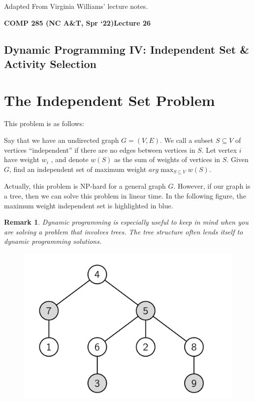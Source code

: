 \documentclass [12pt]{article}
\newtheorem{remark}{Remark}
\theoremstyle{definition}
\begin{document}
 

\vspace {1em} 
\begin {Instruction} 
Adapted From Virginia Williams' lecture notes.
\end {Instruction}  

{\LARGE \textbf {COMP 285 (NC A\&T, Spr `22)}\hfill \textbf {Lecture 26} } 

\begin{centering}
\section*{Dynamic Programming IV: Independent Set \& Activity Selection}
\end{centering}

\section{The Independent Set Problem}

This problem is as follows: 

Say that we have an undirected graph $G = (V, E)$. We call a subset $S \subseteq V$ of vertices ``independent'' if there are no edges between vertices in $S$. Let vertex $i$ have weight $w_i$ , and denote $w(S)$ as the sum of weights of vertices in $S$. Given $G$, find an independent set of maximum weight $arg\max_{S\subseteq V} w(S)$.

Actually, this problem is NP-hard for a general graph $G$. However, if our graph is a tree, then we can solve this problem in linear time. In the following figure, the maximum weight independent set is highlighted in blue.

\begin{remark}
Dynamic programming is especially useful to keep in mind when you are solving a problem that involves trees. The tree structure often lends itself to dynamic programming solutions.
\end{remark}

\begin{figure}[h!]
\centering
\includegraphics[scale=0.5]{max_is.png}
\end{figure}
\end{document}
